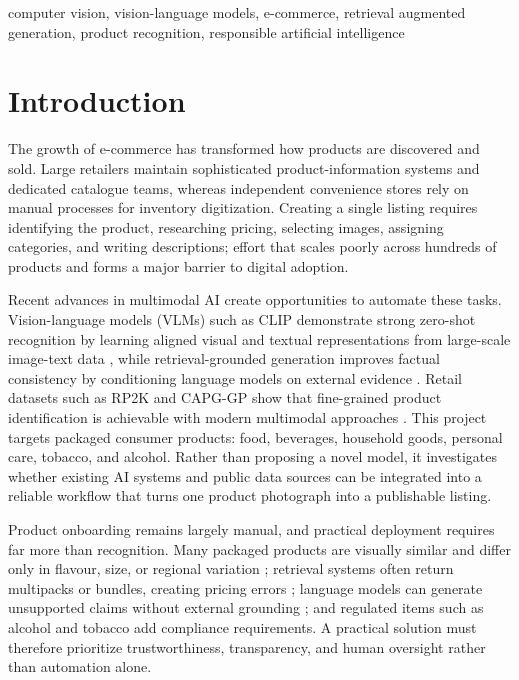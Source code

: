 \documentclass[conference]{IEEEtran}
\begin{document}
\begin{IEEEkeywords}
computer vision, vision-language models, e-commerce, retrieval augmented
generation, product recognition, responsible artificial intelligence
\end{IEEEkeywords}

\section{Introduction}

The growth of e-commerce has transformed how products are discovered and sold.
Large retailers maintain sophisticated product-information systems and dedicated
catalogue teams, whereas independent convenience stores rely on manual processes
for inventory digitization. Creating a single listing requires identifying the
product, researching pricing, selecting images, assigning categories, and
writing descriptions; effort that scales poorly across hundreds of products and
forms a major barrier to digital adoption.

Recent advances in multimodal AI create opportunities to automate these tasks.
Vision-language models (VLMs) such as CLIP demonstrate strong zero-shot
recognition by learning aligned visual and textual representations from
large-scale image-text data \cite{radford2021clip}, while retrieval-grounded
generation improves factual consistency by conditioning language models on
external evidence \cite{li2024modict}. Retail datasets such as RP2K and CAPG-GP
show that fine-grained product identification is achievable with modern
multimodal approaches \cite{peng2020rp2k,geng2018oneshot}. This project targets
packaged consumer products: food, beverages, household goods, personal care,
tobacco, and alcohol. Rather than proposing a novel model, it investigates
whether existing AI systems and public data sources can be integrated into a
reliable workflow that turns one product photograph into a publishable listing.

Product onboarding remains largely manual, and practical deployment requires far
more than recognition. Many packaged products are visually similar and differ
only in flavour, size, or regional variation \cite{peng2020rp2k}; retrieval
systems often return multipacks or bundles, creating pricing errors
\cite{llp2025}; language models can generate unsupported claims without external
grounding \cite{li2024modict}; and regulated items such as alcohol and tobacco
add compliance requirements. A practical solution must therefore prioritize
trustworthiness, transparency, and human oversight rather than automation alone.
\end{document}
